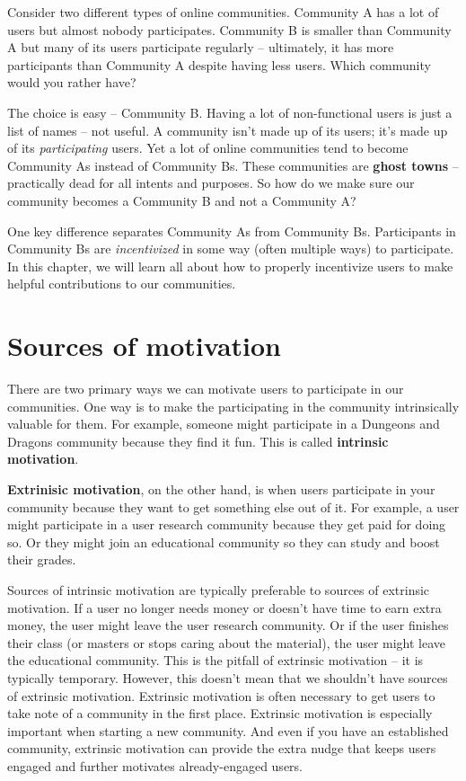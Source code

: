 \documentclass[class=book, crop=false]{standalone}
\providecommand{\keyterm}[1]{\textbf{#1}\marginnote{\scriptsize \textbf{#1}}}
\begin{document}
Consider two different types of online communities. Community A has a lot of users but almost nobody participates. Community B is smaller than Community A but many of its users participate regularly -- ultimately, it has more participants than Community A despite having less users. Which community would you rather have?

The choice is easy -- Community B. Having a lot of non-functional users is just a list of names -- not useful. A community isn't made up of its users; it's made up of its \textit{participating} users. Yet a lot of online communities tend to become Community As instead of Community Bs. These communities are \keyterm{ghost towns} -- practically dead for all intents and purposes. So how do we make sure our community becomes a Community B and not a Community A?

One key difference separates Community As from Community Bs. Participants in Community Bs are \textit{incentivized} in some way (often multiple ways) to participate. In this chapter, we will learn all about how to properly incentivize users to make helpful contributions to our communities.

\section{Sources of motivation}

There are two primary ways we can motivate users to participate in our communities. One way is to make the participating in the community intrinsically valuable for them. For example, someone might participate in a Dungeons and Dragons community because they find it fun. This is called \keyterm{intrinsic motivation}.

\keyterm{Extrinisic motivation}, on the other hand, is when users participate in your community because they want to get something else out of it. For example, a user might participate in a user research community because they get paid for doing so. Or they might join an educational community so they can study and boost their grades.

Sources of intrinsic motivation are typically preferable to sources of extrinsic motivation. If a user no longer needs money or doesn't have time to earn extra money, the user might leave the user research community. Or if the user finishes their class (or masters or stops caring about the material), the user might leave the educational community. This is the pitfall of extrinsic motivation -- it is typically temporary. However, this doesn't mean that we shouldn't have sources of extrinsic motivation. Extrinsic motivation is often necessary to get users to take note of a community in the first place. Extrinsic motivation is especially important when starting a new community. And even if you have an established community, extrinsic motivation can provide the extra nudge that keeps users engaged and further motivates already-engaged users.
\end{document}
